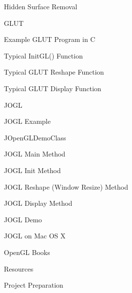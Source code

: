 \documentclass[xcolor=dvipsnames,t]{beamer}
\newcommand{\showcode}[1]{\begin{mdframed}[style=code] %
                          \end{mdframed}%
}
\begin{document}
\begin{frame}{Hidden Surface Removal} 
\end{frame} 

\begin{frame}{GLUT} 
\end{frame} 

\begin{frame}{Example GLUT Program in C} 
    \showcode{glutmain.c} 
\end{frame} 

\begin{frame}{Typical InitGL() Function} 
    \showcode{initgl.c} 
\end{frame} 

\begin{frame}{Typical GLUT Reshape Function} 
    \showcode{reshape.c} 
\end{frame} 

\begin{frame}{Typical GLUT Display Function} 
    \showcode{display.c} 
\end{frame} 

\begin{frame}{JOGL} 
\end{frame} 

\begin{frame}{JOGL Example} 
\end{frame} 

\begin{frame}{JOpenGLDemoClass}
\end{frame} 

\begin{frame}{JOGL Main Method} 
\end{frame} 

\begin{frame}{JOGL Init Method} 
\end{frame} 

\begin{frame}{JOGL Reshape (Window Resize) Method} 
\end{frame}

\begin{frame}{JOGL Display Method} 
\end{frame} 

\begin{frame}{JOGL Demo} 
\end{frame} 

\begin{frame}{JOGL on Mac OS X} 
\end{frame} 

\begin{frame}{OpenGL Books} 
\end{frame} 

\begin{frame}{Resources} 
\end{frame} 

\begin{frame}{Project Preparation} 
\end{frame} 
\end{document}
